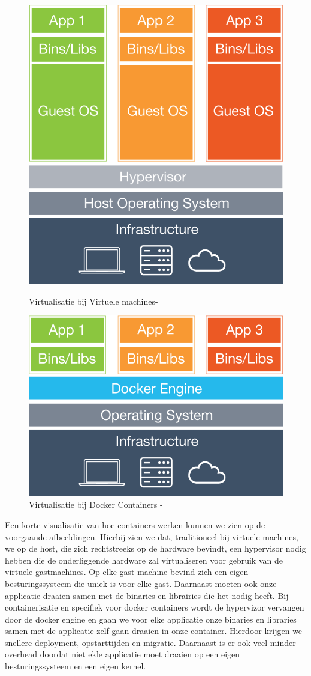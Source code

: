 \begin{figure}[!ht]
	\centering
	\begin{minipage}{.5\textwidth}
		\centering
		\includegraphics[width=.7\linewidth]{img/what-is-docker-diagram.png}
		\caption{Virtualisatie bij Virtuele machines- \protect\cite{Docker2016d}}
		\label{fig:test1}
	\end{minipage}%
	\begin{minipage}{.5\textwidth}
		\centering
		\includegraphics[width=.7\linewidth]{img/what-is-vm-diagram.png}
		\caption{Virtualisatie bij Docker Containers - \protect\cite{Docker2016d}}
		\label{fig:test2}
	\end{minipage}
\end{figure}

Een korte visualisatie van hoe containers werken kunnen we zien op de voorgaande afbeeldingen. Hierbij zien we dat, traditioneel bij virtuele machines, we op de host, die zich rechtstreeks op de hardware bevindt, een hypervisor nodig hebben die de onderliggende hardware zal virtualiseren voor gebruik van de virtuele gastmachines. Op elke gast machine bevind zich een eigen besturingssysteem die uniek is voor elke gast. Daarnaast moeten ook onze applicatie draaien samen met de binaries en librairies die het nodig heeft. Bij containerisatie en specifiek voor docker containers wordt de hypervizor vervangen door de docker engine en gaan we voor elke applicatie onze binaries en libraries samen met de applicatie zelf gaan draaien in onze container. Hierdoor krijgen we snellere deployment, opstarttijden en migratie. Daarnaast is er ook veel minder overhead doordat niet ekle applicatie moet draaien op een eigen besturingssysteem en een eigen kernel. 

